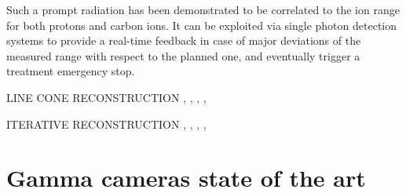 Such a prompt radiation has been demonstrated to be correlated to the ion range for both protons and carbon ions. It can be exploited via single photon detection systems to provide a real-time feedback in case of major deviations of the measured range with respect to the planned one, and eventually trigger a treatment emergency stop.

LINE CONE RECONSTRUCTION \parencite{Cree1994}, \parencite{Basko1998}, \parencite{Parra1999}, \parencite{Hirasawa2003}, \parencite{Maxim2009} 

ITERATIVE RECONSTRUCTION \parencite{Schone2010}, \parencite{Zoglauer2011}, \parencite{Gillam2011}, \parencite{Lojacono2013}, \parencite{Mackin2012}


\section{Gamma cameras state of the art}

\clearpage
